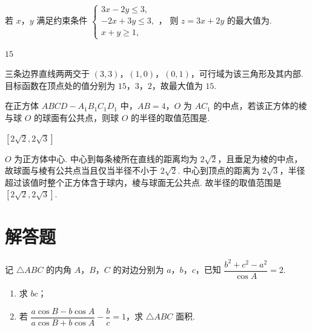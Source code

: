 \begin{problem}
若 \(x\)，\(y\) 满足约束条件
\(\begin{cases}
3x-2y\le3,\\
-2x+3y\le3,\\
x+y\ge1,
\end{cases}\)，
则 \(z=3x+2y\) 的最大值为\fillinblank{}.
\end{problem}

\begin{answer}
\(15\)
\end{answer}

\begin{solution}
三条边界直线两两交于 \((3,3)\)，\((1,0)\)，\((0,1)\)，可行域为该三角形及其内部. 目标函数在顶点处的值分别为 \(15\)，\(3\)，\(2\)，故最大值为 \(15\).
\end{solution}

\begin{problem}
在正方体 \(ABCD-A_1B_1C_1D_1\) 中，\(AB=4\)，\(O\) 为 \(AC_1\) 的中点，若该正方体的棱与球 \(O\) 的球面有公共点，则球 \(O\) 的半径的取值范围是\fillinblank{}.
\end{problem}

\begin{answer}
\(\left[2\sqrt{2},2\sqrt{3}\right]\)
\end{answer}

\begin{solution}
\(O\) 为正方体中心. 中心到每条棱所在直线的距离均为 \(2\sqrt2\)，且垂足为棱的中点，故球面与棱有公共点当且仅当半径不小于 \(2\sqrt2\). 中心到顶点的距离为 \(2\sqrt3\)，半径超过该值时整个正方体含于球内，棱与球面无公共点. 故半径的取值范围是 \(\left[2\sqrt{2},2\sqrt{3}\right]\).
\end{solution}

\section{解答题}

\begin{problem}
记 \(\triangle ABC\) 的内角 \(A\)，\(B\)，\(C\) 的对边分别为 \(a\)，\(b\)，\(c\)，已知 \(\dfrac{b^2+c^2-a^2}{\cos A}=2\).
\begin{enumerate}
\item 求 \(bc\)；
\item 若 \(\dfrac{a\cos B-b\cos A}{a\cos B+b\cos A}-\dfrac{b}{c}=1\)，求 \(\triangle ABC\) 面积.
\end{enumerate}
\end{problem}

